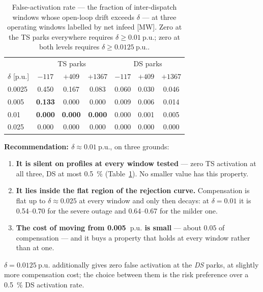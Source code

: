 \documentclass[11pt,a4paper]{article}
\newcommand{\pu}{\ensuremath{\mathrm{p.u.}}}
\newcommand{\dz}{\ensuremath{\delta}}
\begin{document}
\begin{table}[htbp]
\centering
\begin{tabular}{lccc|ccc}
\toprule
& \multicolumn{3}{c|}{TS parks} & \multicolumn{3}{c}{DS parks} \\
$\dz$ [\pu] & $-117$ & $+409$ & $+1367$ & $-117$ & $+409$ & $+1367$ \\
\midrule
0.0025 & 0.450 & 0.167 & 0.083 & 0.060 & 0.030 & 0.046 \\
0.005  & \textbf{0.133} & 0.000 & 0.000 & 0.009 & 0.006 & 0.014 \\
0.01   & \textbf{0.000} & \textbf{0.000} & \textbf{0.000} & 0.000 & 0.001 & 0.005 \\
0.025  & 0.000 & 0.000 & 0.000 & 0.000 & 0.000 & 0.000 \\
\bottomrule
\end{tabular}
\caption{False-activation rate --- the fraction of inter-dispatch windows whose
open-loop drift exceeds $\dz$ --- at three operating windows labelled by net
infeed [\si{\mega\watt}]. Zero at the TS parks everywhere requires
$\dz \geq \SI{0.01}{\pu}$; zero at both levels requires $\dz \geq
\SI{0.0125}{\pu}$.}
\label{tab:n1fa}
\end{table}

\textbf{Recommendation: $\dz \approx \SI{0.01}{\pu}$}, on three grounds:

\begin{enumerate}
  \item \textbf{It is silent on profiles at every window tested} --- zero TS
    activation at all three, DS at most \SI{0.5}{\percent}
    (Table~\ref{tab:n1fa}). No smaller value has this property.
  \item \textbf{It lies inside the flat region of the rejection curve.}
    Compensation is flat up to $\dz \approx 0.025$ at every window and only then
    decays: at $\dz=0.01$ it is \numrange{0.54}{0.70} for the severe outage and
    \numrange{0.64}{0.67} for the milder one.
  \item \textbf{The cost of moving from \SI{0.005}{\pu} is small} --- about
    $0.05$ of compensation --- and it buys a property that holds at every window
    rather than at one.
\end{enumerate}

\noindent $\dz = \SI{0.0125}{\pu}$ additionally gives zero false activation at
the \emph{DS} parks, at slightly more compensation cost; the choice between them
is the risk preference over a \SI{0.5}{\percent} DS activation rate.
\end{document}
